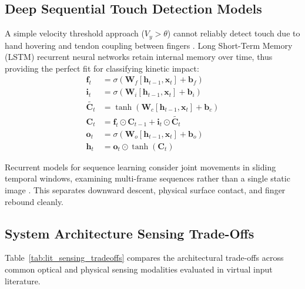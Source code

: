 \subsection{Deep Sequential Touch Detection Models}
\label{subsec:lit_deep_touch}
A simple velocity threshold approach ($V_y > \theta$) cannot reliably detect touch due to hand hovering and tendon coupling between fingers \cite{Simao2016Unsupervised, Toshpulatov2024RealTime}. Long Short-Term Memory (LSTM) recurrent neural networks \cite{Hochreiter1997LSTM} retain internal memory over time, thus providing the perfect fit for classifying kinetic impact:
\begin{align}
\mathbf{f}_t &= \sigma(\mathbf{W}_f [\mathbf{h}_{t-1}, \mathbf{x}_t] + \mathbf{b}_f) \label{eq:lstm_forget_def} \\
\mathbf{i}_t &= \sigma(\mathbf{W}_i [\mathbf{h}_{t-1}, \mathbf{x}_t] + \mathbf{b}_i) \label{eq:lstm_input_def} \\
\tilde{\mathbf{C}_t} &= \tanh(\mathbf{W}_c [\mathbf{h}_{t-1}, \mathbf{x}_t] + \mathbf{b}_c) \label{eq:lstm_candidate_def} \\
\mathbf{C}_t &= \mathbf{f}_t \odot \mathbf{C}_{t-1} + \mathbf{i}_t \odot \tilde{\mathbf{C}_t} \label{eq:lstm_cell_def} \\
\mathbf{o}_t &= \sigma(\mathbf{W}_o [\mathbf{h}_{t-1}, \mathbf{x}_t] + \mathbf{b}_o) \label{eq:lstm_output_def} \\
\mathbf{h}_t &= \mathbf{o}_t \odot \tanh(\mathbf{C}_t) \label{eq:lstm_hidden_def}
\end{align}

Recurrent models for sequence learning consider joint movements in sliding temporal windows, examining multi-frame sequences rather than a single static image \cite{Nunez2018Convolutional, Ikram2020Skeleton, Doan2022Efficient}. This separates downward descent, physical surface contact, and finger rebound cleanly.

\subsection{System Architecture Sensing Trade-Offs}
\label{subsec:lit_sensing_tradeoffs}
Table~\ref{tab:lit_sensing_tradeoffs} compares the architectural trade-offs across common optical and physical sensing modalities evaluated in virtual input literature.

